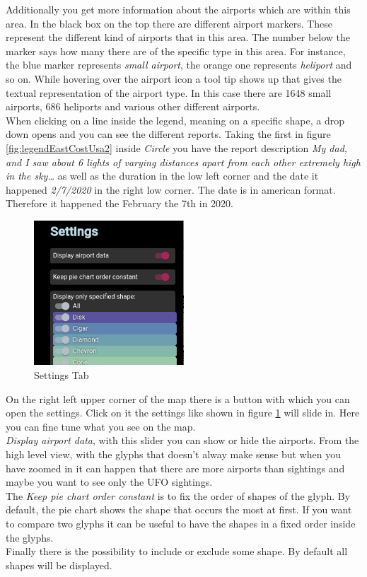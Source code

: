 \documentclass{article}
\begin{document}
Additionally you get more information about the airports which are within this area. In the 
black box on the top there are different airport markers. These represent the different kind of airports
that in this area. The number below the marker says how many there are of the specific type
in this area. For instance, the blue marker represents \textit{small airport}, the orange
one represents \textit{heliport} and so on. While hovering over the airport icon a tool tip
shows up that gives the textual representation of the airport type. In this case there are 
1648 small airports, 686 heliports and various other different airports. 
\\
When clicking on a line inside the legend, meaning on a specific shape, a drop down opens and you
can see the different reports. Taking the first in figure \ref{fig:legendEastCostUsa2} inside \textit{Circle}
you have the report description 
\textit{My dad, and I saw about 6 lights of varying distances apart from each other extremely high in the sky…}
as well as the duration in the low left corner and the date it happened \textit{2/7/2020} in the right low corner. The date is in 
american format. Therefore it happened the February the 7th in 2020.
\\
\newpage
\begin{figure} 
    \centering
    \includegraphics[width=0.5\textwidth]{SettingsTap}
    \caption{Settings Tab}
    \label{fig:SettingsTap}
\end{figure}

On the right left upper corner of the map there is a button with which you can open the settings.
Click on it the settings like shown in figure \ref{fig:SettingsTap} will slide in. Here you can fine tune
what you see on the map. \\
\textit{Display airport data}, with this slider you can show or hide the airports. From the high level view,
with the glyphs that doesn't alway make sense but when you have zoomed in it can happen that there
are more airports than sightings and maybe you want to see only the UFO sightings.
\\
The \textit{Keep pie chart order constant} is to fix the order of shapes of the glyph. By default, the pie chart
shows the shape that occurs the most at first. If you want to compare two glyphs it can be useful to have the
shapes in a fixed order inside the glyphs.
\\
Finally there is the possibility to include or exclude some shape. By default all shapes will be displayed.
\\
\end{document}
